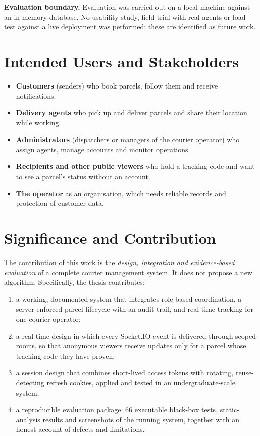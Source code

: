 \textbf{Evaluation boundary.} Evaluation was carried out on a local machine against an in-memory database. No usability study, field trial with real agents or load test against a live deployment was performed; these are identified as future work.

\section{Intended Users and Stakeholders}
\label{sec:stakeholders-intro}

\begin{itemize}
  \item \textbf{Customers} (senders) who book parcels, follow them and receive notifications.
  \item \textbf{Delivery agents} who pick up and deliver parcels and share their location while working.
  \item \textbf{Administrators} (dispatchers or managers of the courier operator) who assign agents, manage accounts and monitor operations.
  \item \textbf{Recipients and other public viewers} who hold a tracking code and want to see a parcel's status without an account.
  \item \textbf{The operator} as an organisation, which needs reliable records and protection of customer data.
\end{itemize}

\section{Significance and Contribution}
\label{sec:contribution}

The contribution of this work is the \emph{design, integration and evidence-based evaluation} of a complete courier management system. It does not propose a new algorithm. Specifically, the thesis contributes:
\begin{enumerate}
  \item a working, documented system that integrates role-based coordination, a server-enforced parcel lifecycle with an audit trail, and real-time tracking for one courier operator;
  \item a real-time design in which every Socket.IO event is delivered through scoped rooms, so that anonymous viewers receive updates only for a parcel whose tracking code they have proven;
  \item a session design that combines short-lived access tokens with rotating, reuse-detecting refresh cookies, applied and tested in an undergraduate-scale system;
  \item a reproducible evaluation package: 66 executable black-box tests, static-analysis results and screenshots of the running system, together with an honest account of defects and limitations.
\end{enumerate}

